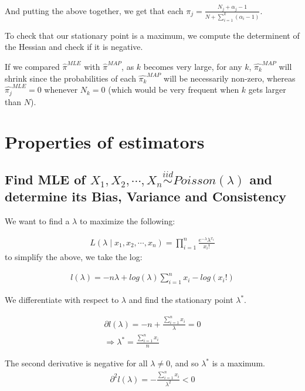 \documentclass[paper=a4, fontsize=11pt]{scrartcl} %
\numberwithin{equation}{section} %
\numberwithin{figure}{section} %
\numberwithin{table}{section} %
\begin{document}
And putting the above together, we get that each
$\pi_j = \frac{N_j + \alpha_j -1}{N + \sum_{i=1}^k (\alpha_i - 1)}$.

To check that our stationary point is a maximum, we compute the determinent of the Hessian and check if it is negative.
\newline

If we compared $\hat{\pi}^{MLE}$ with $\hat{\pi}^{MAP}$, as $k$ becomes very large, for any $k$, $\hat{\pi_k}^{MAP}$ will shrink since the probabilities of each $\hat{\pi_k}^{MAP}$ will be necessarily non-zero, whereas $\hat{\pi_j}^{MLE} = 0$ whenever $N_k = 0$ (which would be very frequent when $k$ gets larger than $N$).

\section{Properties of estimators}

\subsection{Find MLE of $X_1, X_2, \cdots, X_n \overset{iid}{\sim} Poisson(\lambda)$ and determine its Bias, Variance and Consistency}

We want to find a $\lambda$ to maximize the following: 

\begin{align*}
L(\lambda \mid x_1, x_2, \cdots, x_n) = \prod_{i=1}^{n}\frac{e^{-\lambda}\lambda^{x_i}}{x_i !}
\end{align*}
to simplify the above, we take the log:

\begin{align*}
l(\lambda) = -n\lambda + log(\lambda)\sum_{i=1}^{n}x_i - log(x_i!)
\end{align*}

We differentiate with respect to $\lambda$ and find the stationary point $\lambda^*$.

\begin{align*}
\partial l(\lambda) = -n + \frac{\sum_{i=1}^{n}x_i}{\lambda} = 0 \\
\Rightarrow \lambda^* = \frac{\sum_{i=1}^{n}x_i}{n}
\end{align*}

The second derivative is negative for all $\lambda \ne 0$, and so $\lambda^*$ is a maximum.
\begin{align*}
\partial^2 l(\lambda) = -\frac{\sum_{i=1}^{n}x_i}{\lambda^2} < 0
\end{align*}
\end{document}
